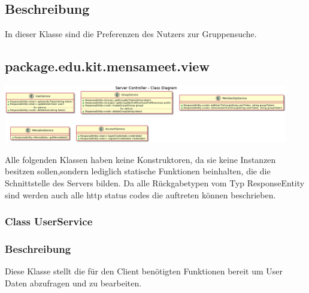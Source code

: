 \documentclass[a4paper]{scrreprt}
\begin{document}
\subsection*{Beschreibung}
In dieser Klasse sind die Preferenzen des Nutzers zur Gruppensuche.



\subsection{package.edu.kit.mensameet.view}

\begin{center}
	\includegraphics[width=0.93\textwidth]{Klassendiagramme/serverViewCD.png}
\end{center}


Alle folgenden Klassen haben keine Konstruktoren, da sie keine Instanzen besitzen sollen,sondern lediglich statische Funktionen beinhalten, die die Schnittstelle des Servers bilden. Da alle Rückgabetypen vom Typ ResponseEntity sind werden auch alle http status codes die auftreten können beschrieben.

\subsubsection{Class UserService}
\subsubsection*{Beschreibung}
Diese Klasse stellt die für den Client benötigten Funktionen bereit um User Daten abzufragen und zu bearbeiten. 
\end{document}
